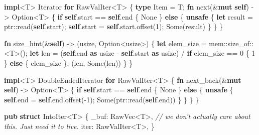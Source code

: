 \documentclass[a4paper,]{book}
\newenvironment{Shaded}{\begin{snugshade}}{\end{snugshade}}
\newcommand{\KeywordTok}[1]{\textcolor[rgb]{0.13,0.29,0.53}{\textbf{{#1}}}}
\newcommand{\DataTypeTok}[1]{\textcolor[rgb]{0.13,0.29,0.53}{{#1}}}
\newcommand{\DecValTok}[1]{\textcolor[rgb]{0.00,0.00,0.81}{{#1}}}
\newcommand{\ConstantTok}[1]{\textcolor[rgb]{0.00,0.00,0.00}{{#1}}}
\newcommand{\CommentTok}[1]{\textcolor[rgb]{0.56,0.35,0.01}{\textit{{#1}}}}
\newcommand{\BuiltInTok}[1]{{#1}}
\newcommand{\NormalTok}[1]{{#1}}
\begin{document}
\begin{Shaded}
\begin{Highlighting}[]
\KeywordTok{impl}\NormalTok{<T> }\BuiltInTok{Iterator} \KeywordTok{for} \NormalTok{RawValIter<T> \{}
    \KeywordTok{type} \NormalTok{Item = T;}
    \KeywordTok{fn} \NormalTok{next(&}\KeywordTok{mut} \KeywordTok{self}\NormalTok{) -> }\DataTypeTok{Option}\NormalTok{<T> \{}
        \KeywordTok{if} \KeywordTok{self}\NormalTok{.start == }\KeywordTok{self}\NormalTok{.end \{}
            \ConstantTok{None}
        \NormalTok{\} }\KeywordTok{else} \NormalTok{\{}
            \KeywordTok{unsafe} \NormalTok{\{}
                \KeywordTok{let} \NormalTok{result = ptr::read(}\KeywordTok{self}\NormalTok{.start);}
                \KeywordTok{self}\NormalTok{.start = }\KeywordTok{self}\NormalTok{.start.offset(}\DecValTok{1}\NormalTok{);}
                \ConstantTok{Some}\NormalTok{(result)}
            \NormalTok{\}}
        \NormalTok{\}}
    \NormalTok{\}}

    \KeywordTok{fn} \NormalTok{size_hint(&}\KeywordTok{self}\NormalTok{) -> (}\DataTypeTok{usize}\NormalTok{, }\DataTypeTok{Option}\NormalTok{<}\DataTypeTok{usize}\NormalTok{>) \{}
        \KeywordTok{let} \NormalTok{elem_size = mem::size_of::<T>();}
        \KeywordTok{let} \NormalTok{len = (}\KeywordTok{self}\NormalTok{.end }\KeywordTok{as} \DataTypeTok{usize} \NormalTok{- }\KeywordTok{self}\NormalTok{.start }\KeywordTok{as} \DataTypeTok{usize}\NormalTok{)}
                  \NormalTok{/ }\KeywordTok{if} \NormalTok{elem_size == }\DecValTok{0} \NormalTok{\{ }\DecValTok{1} \NormalTok{\} }\KeywordTok{else} \NormalTok{\{ elem_size \};}
        \NormalTok{(len, }\ConstantTok{Some}\NormalTok{(len))}
    \NormalTok{\}}
\NormalTok{\}}

\KeywordTok{impl}\NormalTok{<T> }\BuiltInTok{DoubleEndedIterator} \KeywordTok{for} \NormalTok{RawValIter<T> \{}
    \KeywordTok{fn} \NormalTok{next_back(&}\KeywordTok{mut} \KeywordTok{self}\NormalTok{) -> }\DataTypeTok{Option}\NormalTok{<T> \{}
        \KeywordTok{if} \KeywordTok{self}\NormalTok{.start == }\KeywordTok{self}\NormalTok{.end \{}
            \ConstantTok{None}
        \NormalTok{\} }\KeywordTok{else} \NormalTok{\{}
            \KeywordTok{unsafe} \NormalTok{\{}
                \KeywordTok{self}\NormalTok{.end = }\KeywordTok{self}\NormalTok{.end.offset(-}\DecValTok{1}\NormalTok{);}
                \ConstantTok{Some}\NormalTok{(ptr::read(}\KeywordTok{self}\NormalTok{.end))}
            \NormalTok{\}}
        \NormalTok{\}}
    \NormalTok{\}}
\NormalTok{\}}




\KeywordTok{pub} \KeywordTok{struct} \NormalTok{IntoIter<T> \{}
    \NormalTok{_buf: RawVec<T>, }\CommentTok{// we don't actually care about this. Just need it to live.}
    \NormalTok{iter: RawValIter<T>,}
\NormalTok{\}}


\end{Highlighting}
\end{Shaded}
\end{document}
